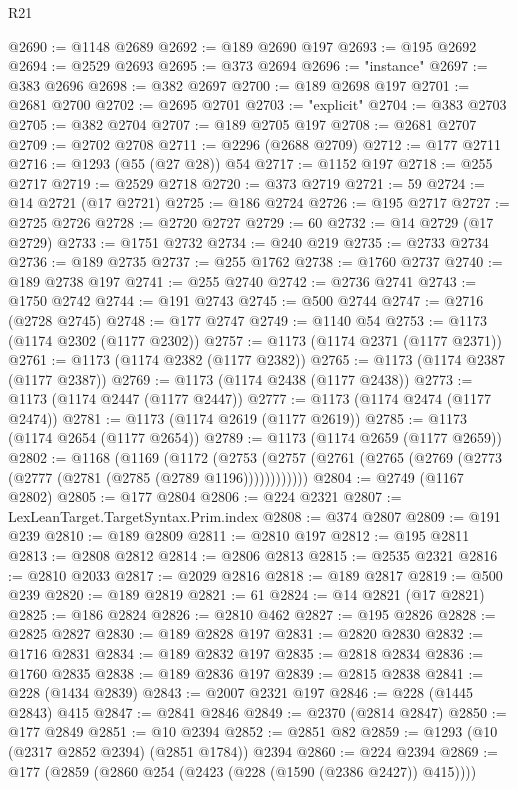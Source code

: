 \begin{lexlean}{R21}
\begin{coremodule}
@2690 := @1148 @2689
@2692 := @189 @2690 @197
@2693 := @195 @2692
@2694 := @2529 @2693
@2695 := @373 @2694
@2696 := "instance"
@2697 := @383 @2696
@2698 := @382 @2697
@2700 := @189 @2698 @197
@2701 := @2681 @2700
@2702 := @2695 @2701
@2703 := "explicit"
@2704 := @383 @2703
@2705 := @382 @2704
@2707 := @189 @2705 @197
@2708 := @2681 @2707
@2709 := @2702 @2708
@2711 := @2296 (@2688 @2709)
@2712 := @177 @2711
@2716 := @1293 (@55 (@27 @28)) @54
@2717 := @1152 @197
@2718 := @255 @2717
@2719 := @2529 @2718
@2720 := @373 @2719
@2721 := 59
@2724 := @14 @2721 (@17 @2721)
@2725 := @186 @2724
@2726 := @195 @2717
@2727 := @2725 @2726
@2728 := @2720 @2727
@2729 := 60
@2732 := @14 @2729 (@17 @2729)
@2733 := @1751 @2732
@2734 := @240 @219
@2735 := @2733 @2734
@2736 := @189 @2735
@2737 := @255 @1762
@2738 := @1760 @2737
@2740 := @189 @2738 @197
@2741 := @255 @2740
@2742 := @2736 @2741
@2743 := @1750 @2742
@2744 := @191 @2743
@2745 := @500 @2744
@2747 := @2716 (@2728 @2745)
@2748 := @177 @2747
@2749 := @1140 @54
@2753 := @1173 (@1174 @2302 (@1177 @2302))
@2757 := @1173 (@1174 @2371 (@1177 @2371))
@2761 := @1173 (@1174 @2382 (@1177 @2382))
@2765 := @1173 (@1174 @2387 (@1177 @2387))
@2769 := @1173 (@1174 @2438 (@1177 @2438))
@2773 := @1173 (@1174 @2447 (@1177 @2447))
@2777 := @1173 (@1174 @2474 (@1177 @2474))
@2781 := @1173 (@1174 @2619 (@1177 @2619))
@2785 := @1173 (@1174 @2654 (@1177 @2654))
@2789 := @1173 (@1174 @2659 (@1177 @2659))
@2802 := @1168
    (@1169
      (@1172 (@2753 (@2757 (@2761 (@2765 (@2769 (@2773 (@2777 (@2781 (@2785 (@2789 @1196))))))))))))
@2804 := @2749 (@1167 @2802)
@2805 := @177 @2804
@2806 := @224 @2321
@2807 := LexLeanTarget.TargetSyntax.Prim.index
@2808 := @374 @2807
@2809 := @191 @239
@2810 := @189 @2809
@2811 := @2810 @197
@2812 := @195 @2811
@2813 := @2808 @2812
@2814 := @2806 @2813
@2815 := @2535 @2321
@2816 := @2810 @2033
@2817 := @2029 @2816
@2818 := @189 @2817
@2819 := @500 @239
@2820 := @189 @2819
@2821 := 61
@2824 := @14 @2821 (@17 @2821)
@2825 := @186 @2824
@2826 := @2810 @462
@2827 := @195 @2826
@2828 := @2825 @2827
@2830 := @189 @2828 @197
@2831 := @2820 @2830
@2832 := @1716 @2831
@2834 := @189 @2832 @197
@2835 := @2818 @2834
@2836 := @1760 @2835
@2838 := @189 @2836 @197
@2839 := @2815 @2838
@2841 := @228 (@1434 @2839)
@2843 := @2007 @2321 @197
@2846 := @228 (@1445 @2843) @415
@2847 := @2841 @2846
@2849 := @2370 (@2814 @2847)
@2850 := @177 @2849
@2851 := @10 @2394
@2852 := @2851 @82
@2859 := @1293 (@10 (@2317 @2852 @2394) (@2851 @1784)) @2394
@2860 := @224 @2394
@2869 := @177 (@2859 (@2860 @254 (@2423 (@228 (@1590 (@2386 @2427)) @415))))

\end{coremodule}
\end{lexlean}
